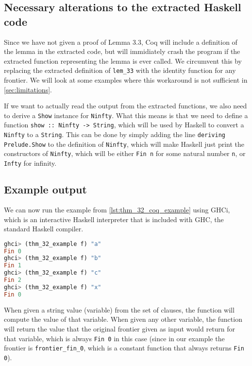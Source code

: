 \subsection{Necessary alterations to the extracted Haskell code}
\label{sec:necessary_alterations}

Since we have not given a proof of Lemma 3.3, Coq will include a definition of the lemma in the extracted code,
but will immidiately crash the program if the extracted function representing the lemma is ever called.
We circumvent this by replacing the extracted definition of \lstinline{lem_33} with the identity function
for any frontier. We will look at some examples where this workaround is not sufficient in
\autoref{sec:limitations}.

If we want to actually read the output from the extracted functions, we also need to
derive a \lstinline{Show} instance for \lstinline{Ninfty}.
What this means is that we need to define a function \lstinline{show :: Ninfty -> String},
which will be used by Haskell to convert a \lstinline{Ninfty} to a \lstinline{String}.
This can be done by simply adding the line \lstinline{deriving Prelude.Show} to the definition of \lstinline{Ninfty},
which will make Haskell just print the constructors of \lstinline{Ninfty},
which will be either \lstinline{Fin n} for some natural number \lstinline{n},
or \lstinline{Infty} for infinity.

\subsection{Example output}
\label{sssec:example_output}

We can now run the example from \autoref{lst:thm_32_coq_example} using GHCi,
which is an interactive Haskell interpreter that is included with GHC, the standard Haskell compiler.

\begin{minipage}{\linewidth}
\begin{lstlisting}[language=Haskell, label={lst:thm_32_haskell_output}, caption={\lstinline{thm_32} example output}]
ghci> (thm_32_example f) "a"
Fin 0
ghci> (thm_32_example f) "b"
Fin 1
ghci> (thm_32_example f) "c"
Fin 2
ghci> (thm_32_example f) "x"
Fin 0
\end{lstlisting}
\end{minipage}

When given a string value (variable) from the set of clauses, the function will compute the value of that variable.
When given any other variable, the function will return the value that the original frontier given as input
would return for that variable, which is always \lstinline{Fin 0} in this case
(since in our example the frontier is \lstinline{frontier_fin_0},
which is a constant function that always returns \lstinline{Fin 0}).

